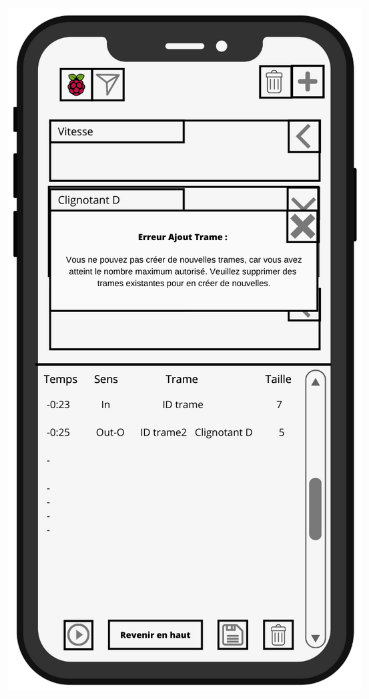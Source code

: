 \begin{minipage}{0.5\linewidth}
    \centering
    \includegraphics[width=0.7\textwidth]{sections/3_Exigences_specifiques/1_IHM/ihm/ecranErreurNombreTrame.png}
    \captionsetup{justification=centering}
    \label{ecran_principal_popup_erreur_nombre_trame}
\end{minipage} \newline 

\newpage

